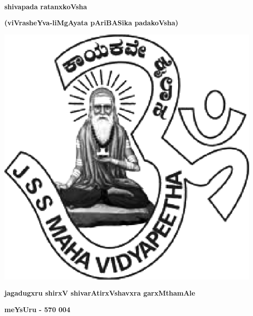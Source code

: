 ~\thispagestyle{empty}

\vfill

\begin{center}
{\fontsize{50}{50}\selectfont\bfseries shivapada ratanxkoVsha}\relax

\medskip

{\LARGE\bfseries (viVrasheYva-liMgAyata pAriBASika padakoVsha)}
\end{center}

\vfill



\vfill


\centerline{\includegraphics[scale=.3]{JSSlogo.eps}}

\medskip

\centerline{\large\bfseries jagadugxru shirxV shivarAtirxVshavxra  garxMthamAle}

\smallskip

\centerline{\large\bfseries meYsUru - 570 004}
